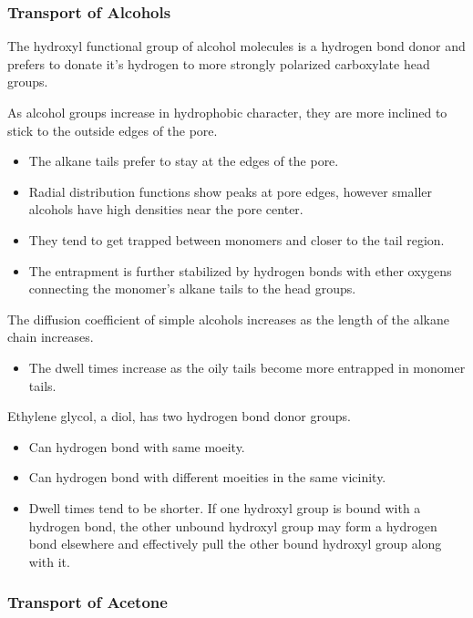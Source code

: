 \documentclass{article}
\begin{document}
  
  \subsubsection*{Transport of Alcohols}

  The hydroxyl functional group of alcohol molecules is a hydrogen bond donor
  and prefers to donate it's hydrogen to more strongly polarized carboxylate head
  groups.

  As alcohol groups increase in hydrophobic character, they are more inclined
  to stick to the outside edges of the pore. 
  \begin{itemize}
	\item The alkane tails prefer to stay at the edges of the pore.
	\item Radial distribution functions show peaks at pore edges, however
	smaller alcohols have high densities near the pore center. 
	\item They tend to get trapped between monomers and closer to 
	the tail region. 
	\item The entrapment is further stabilized by hydrogen bonds with
	ether oxygens connecting the monomer's alkane tails to the head groups.
  \end{itemize}

  The diffusion coefficient of simple alcohols increases as the length of 
  the alkane chain increases.
  \begin{itemize}
	\item The dwell times increase as the oily tails become more
	entrapped in monomer tails.
  \end{itemize}

  Ethylene glycol, a diol, has two hydrogen bond donor groups.
  \begin{itemize}
	\item Can hydrogen bond with same moeity.
	\item Can hydrogen bond with different moeities in the same 
	vicinity. 
	\item Dwell times tend to be shorter. If one hydroxyl group is bound
	with a hydrogen bond, the other unbound hydroxyl group may form a hydrogen bond
	elsewhere and effectively pull the other bound hydroxyl group along with it. 
  \end{itemize}

  \subsubsection*{Transport of Acetone}
\end{document}
